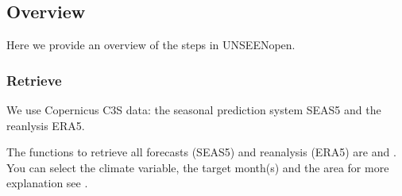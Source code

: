 \documentclass[letterpaper,10pt,english]{sphinxmanual}
\begin{document}
\subsection{Overview}
\label{\detokenize{Notebooks/Workflow:Overview}}
Here we provide an overview of the steps in UNSEEN\sphinxhyphen{}open.


\subsubsection{Retrieve}
\label{\detokenize{Notebooks/Workflow:Retrieve}}
We use  Copernicus C3S data: the seasonal prediction system SEAS5 and the reanlysis ERA5.

The functions to retrieve all forecasts (SEAS5) and reanalysis (ERA5) are  and . You can select the climate variable, the target month(s) and the area \sphinxhyphen{} for more explanation see {\hyperref[\detokenize{Notebooks/1.Download/1.Retrieve::doc}]{}}.

{
\begin{sphinxVerbatim}[commandchars=\\\{\}]
\llap{\color{nbsphinxin}[2]:\,\hspace{\fboxrule}\hspace{\fboxsep}}
    \PYG{p}{[} \PYG{p}{]}
    \PYG{p}{[}  \PYG{p}{]}
    \PYG{p}{[}   \PYG{p}{]}
     
\end{sphinxVerbatim}
}
\end{document}
